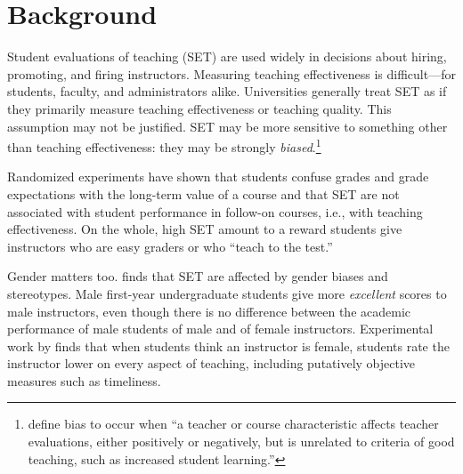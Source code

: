 \documentclass[12pt]{article}
\begin{document}
\begin{quotation}
\begin{abstract}
%

\end{abstract}

\newpage

\end{quotation}

\section{Background}
Student evaluations of teaching (SET) are used widely 
in decisions about hiring, promoting, and firing instructors. 
Measuring teaching effectiveness is difficult---for students,
faculty, and administrators alike.
Universities generally treat SET as if they primarily
measure teaching effectiveness or teaching quality.
This assumption may not be justified.
SET may be more sensitive to something other than teaching effectiveness:
they may be strongly \emph{biased}.\footnote{%
  \citet[p.17]{Centra2000} define bias to occur when ``a teacher
   or course characteristic affects teacher evaluations, either positively or
negatively, but is unrelated to criteria of good teaching, such as increased student learning.'' 
}

Randomized experiments \citep{Carrell2010a,Braga2014}
have shown that students confuse grades 
and grade expectations with the long-term value of a course and that SET are not associated with 
student performance in follow-on courses, i.e., with teaching effectiveness. 
On the whole, high SET amount to a reward students give 
instructors who are easy graders or who ``teach to the test.''  

Gender matters too.
\citet{Boring2015} finds that SET are affected by gender biases and stereotypes. 
Male first-year undergraduate students give more \textit{excellent} scores to male instructors,
even though there is no difference between
the academic performance of male students of male and of female instructors.
Experimental work by \citet{MacNell2014} finds that when students think
an instructor is female,
students rate the instructor lower on every aspect of teaching,
including putatively objective measures such as timeliness.
\end{document}
